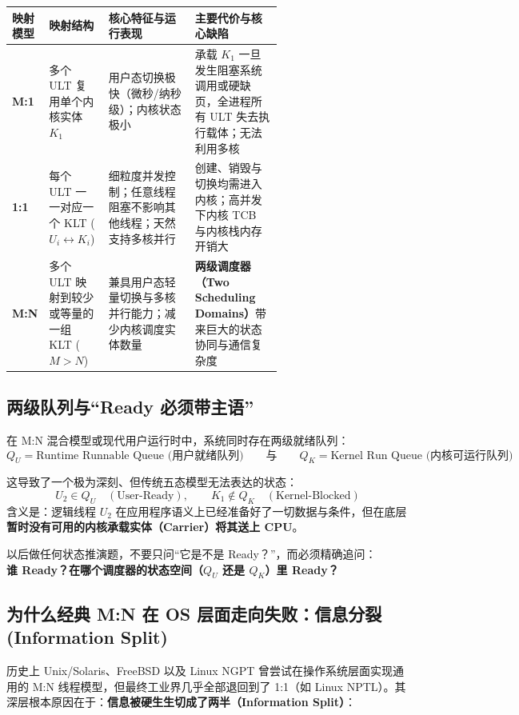 \documentclass[11pt,a4paper]{ctexart}
\newcommand{\kw}[1]{\textbf{#1}}
\begin{document}
\begingroup
\small
\renewcommand{\arraystretch}{1.25}
\setlength{\tabcolsep}{4pt}
\begin{tabularx}{\linewidth}{>{\bfseries}p{0.13\linewidth} p{0.22\linewidth} p{0.32\linewidth} X}
\toprule
映射模型 & 映射结构 & 核心特征与运行表现 & 主要代价与核心缺陷\\
\midrule
M:1 & 多个 ULT 复用单个内核实体 $K_1$ & 用户态切换极快（微秒/纳秒级）；内核状态极小 & 承载 $K_1$ 一旦发生阻塞系统调用或硬缺页，全进程所有 ULT 失去执行载体；无法利用多核\\
1:1 & 每个 ULT 一一对应一个 KLT ($U_i \leftrightarrow K_i$) & 细粒度并发控制；任意线程阻塞不影响其他线程；天然支持多核并行 & 创建、销毁与切换均需进入内核；高并发下内核 TCB 与内核栈内存开销大\\
M:N & 多个 ULT 映射到较少或等量的一组 KLT ($M > N$) & 兼具用户态轻量切换与多核并行能力；减少内核调度实体数量 & \kw{两级调度器（Two Scheduling Domains）}带来巨大的状态协同与通信复杂度\\
\bottomrule
\end{tabularx}
\endgroup

\subsection{两级队列与“Ready 必须带主语”}

在 M:N 混合模型或现代用户运行时中，系统同时存在两级就绪队列：
\[
\boxed{
Q_U = \text{Runtime Runnable Queue (用户就绪队列)}
\qquad\text{与}\qquad
Q_K = \text{Kernel Run Queue (内核可运行队列)}
}
\]

这导致了一个极为深刻、但传统五态模型无法表达的状态：
\[
\boxed{
U_2 \in Q_U \quad (\text{User-Ready}),
\qquad
K_1 \notin Q_K \quad (\text{Kernel-Blocked})
}
\]
含义是：逻辑线程 $U_2$ 在应用程序语义上已经准备好了一切数据与条件，但在底层\kw{暂时没有可用的内核承载实体（Carrier）将其送上 CPU}。

\begin{corebox}[状态判据铁律]
以后做任何状态推演题，不要只问“它是不是 Ready？”，而必须精确追问：\\
\kw{谁 Ready？在哪个调度器的状态空间（$Q_U$ 还是 $Q_K$）里 Ready？}
\end{corebox}

\subsection{为什么经典 M:N 在 OS 层面走向失败：信息分裂 (Information Split)}

历史上 Unix/Solaris、FreeBSD 以及 Linux NGPT 曾尝试在操作系统层面实现通用的 M:N 线程模型，但最终工业界几乎全部退回到了 1:1（如 Linux NPTL）。其深层根本原因在于：\kw{信息被硬生生切成了两半（Information Split）}：
\end{document}
